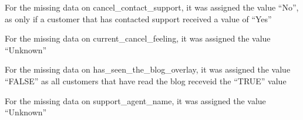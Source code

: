 \documentclass[]{article}
\newenvironment{Shaded}{\begin{snugshade}}{\end{snugshade}}
\newcommand{\KeywordTok}[1]{\textcolor[rgb]{0.13,0.29,0.53}{\textbf{#1}}}
\newcommand{\DataTypeTok}[1]{\textcolor[rgb]{0.13,0.29,0.53}{#1}}
\newcommand{\StringTok}[1]{\textcolor[rgb]{0.31,0.60,0.02}{#1}}
\newcommand{\OperatorTok}[1]{\textcolor[rgb]{0.81,0.36,0.00}{\textbf{#1}}}
\newcommand{\NormalTok}[1]{#1}
\begin{document}
For the missing data on cancel\_contact\_support, it was assigned the
value ``No'', as only if a customer that has contacted support received
a value of ``Yes''

\begin{Shaded}
\end{Shaded}

For the missing data on current\_cancel\_feeling, it was assigned the
value ``Unknown''

\begin{Shaded}
\end{Shaded}

For the missing data on has\_seen\_the\_blog\_overlay, it was assigned
the value ``FALSE'' as all customers that have read the blog receveid
the ``TRUE'' value

\begin{Shaded}
\end{Shaded}

For the missing data on support\_agent\_name, it was assigned the value
``Unknown''

\begin{Shaded}
\end{Shaded}
\end{document}
